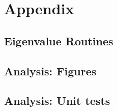 \documentclass[12pt]{article}
\begin{document}
\section{Appendix}
\subsection{Eigenvalue Routines}
  
  

\subsection{Analysis: Figures}
  
    
\subsection{Analysis: Unit tests}
  




\end{document}

